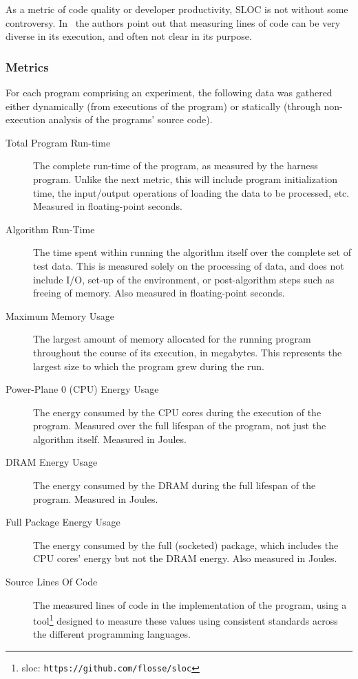 As a metric of code quality or developer productivity, SLOC is not without some controversy. In~\cite{alpernas.2020} the authors point out that measuring lines of code can be very diverse in its execution, and often not clear in its purpose.

\subsubsection{Metrics}

For each program comprising an experiment, the following data was gathered either dynamically (from executions of the program) or statically (through non-execution analysis of the programs' source code).

\begin{description}
\item[Total Program Run-time] The complete run-time of the program, as measured by the harness program. Unlike the next metric, this will include program initialization time, the input/output operations of loading the data to be processed, etc. Measured in floating-point seconds.
\item[Algorithm Run-Time] The time spent within running the algorithm itself over the complete set of test data. This is measured solely on the processing of data, and does not include I/O, set-up of the environment, or post-algorithm steps such as freeing of memory. Also measured in floating-point seconds.
\item[Maximum Memory Usage] The largest amount of memory allocated for the running program throughout the course of its execution, in megabytes. This represents the largest size to which the program grew during the run.
\item[Power-Plane 0 (CPU) Energy Usage] The energy consumed by the CPU cores during the execution of the program. Measured over the full lifespan of the program, not just the algorithm itself. Measured in Joules.
\item[DRAM Energy Usage] The energy consumed by the DRAM during the full lifespan of the program. Measured in Joules.
\item[Full Package Energy Usage] The energy consumed by the full (socketed) package, which includes the CPU cores' energy but not the DRAM energy. Also measured in Joules.
\item[Source Lines Of Code] The measured lines of code in the implementation of the program, using a tool\footnote{sloc: \texttt{https://github.com/flosse/sloc}} designed to measure these values using consistent standards across the different programming languages.
\end{description}

